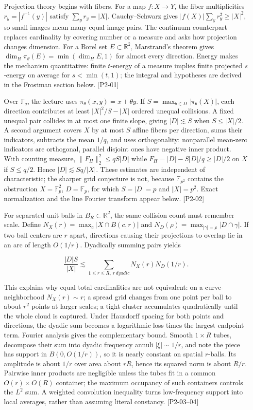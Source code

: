 Projection theory begins with fibers. For a map \(f:X\to Y\), the fiber multiplicities \(r_y=|f^{-1}(y)|\) satisfy \(\sum_y r_y=|X|\). Cauchy--Schwarz gives \(|f(X)|\sum_y r_y^2\ge|X|^2\), so small images mean many equal-image pairs. The continuum counterpart replaces cardinality by covering number or a measure and asks how projection changes dimension. For a Borel set \(E\subset\mathbb R^2\), Marstrand's theorem gives \(\dim_H\pi_\theta(E)=\min(\dim_HE,1)\) for almost every direction. Energy makes the mechanism quantitative: finite \(t\)-energy of a measure implies finite projected \(s\)-energy on average for \(s<\min(t,1)\); the integral and hypotheses are derived in the Frostman section below. {[}P2-01{]}

Over \(\mathbb F_q\), the lecture uses \(\pi_\theta(x,y)=x+\theta y\). If \(S=\max_{\theta\in D}|\pi_\theta(X)|\), each direction contributes at least \(|X|^2/S-|X|\) ordered unequal collisions. A fixed unequal pair collides in at most one finite slope, giving \(|D|\lesssim S\) when \(S\le|X|/2\). A second argument covers \(X\) by at most \(S\) affine fibers per direction, sums their indicators, subtracts the mean \(1/q\), and uses orthogonality: nonparallel mean-zero indicators are orthogonal, parallel disjoint ones have negative inner product. With counting measure, \(\|F_H\|_2^2\le qS|D|\) while \(F_H=|D|-S|D|/q\ge|D|/2\) on \(X\) if \(S\le q/2\). Hence \(|D|\lesssim Sq/|X|\). These estimates are independent of characteristic; the sharper grid conjecture is not, because \(\mathbb F_{p^2}\) contains the obstruction \(X=\mathbb F_p^2\), \(D=\mathbb F_p\), for which \(S=|D|=p\) and \(|X|=p^2\). Exact normalization and the line Fourier transform appear below. {[}P2-02{]}

For separated unit balls in \(B_R\subset\mathbb R^2\), the same collision count must remember scale. Define \(N_X(r)=\max_c|X\cap B(c,r)|\) and \(N_D(\rho)=\max_{|\gamma|=\rho}|D\cap\gamma|\). If two ball centers are \(r\) apart, directions causing their projections to overlap lie in an arc of length \(O(1/r)\). Dyadically summing pairs yields

\[\frac{|D|S}{|X|}\lesssim\sum_{1\le r\le R,\ r\ dyadic}N_X(r)N_D(1/r).\]

This explains why equal total cardinalities are not equivalent: on a curve-neighborhood \(N_X(r)\sim r\); a spread grid changes from one point per ball to about \(r^2\) points at larger scales; a tight cluster accumulates quadratically until the whole cloud is captured. Under Hausdorff spacing for both points and directions, the dyadic sum becomes a logarithmic loss times the largest endpoint term. Fourier analysis gives the complementary bound. Smooth \(1\times R\) tubes, decompose their sum into dyadic frequency annuli \(|\xi|\sim1/r\), and note the piece has support in \(B(0,O(1/r))\), so it is nearly constant on spatial \(r\)-balls. Its amplitude is about \(1/r\) over area about \(rR\), hence its squared norm is about \(R/r\). Pairwise inner products are negligible unless the tubes fit in a common \(O(r)\times O(R)\) container; the maximum occupancy of such containers controls the \(L^2\) sum. A weighted convolution inequality turns low-frequency support into local averages, rather than assuming literal constancy. {[}P2-03--04{]}


